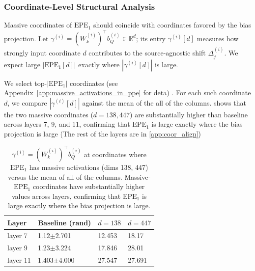 \documentclass[11pt]{article}
\newif\ifResolvedcomments
\newcommand{\Resolved}[1]{\ifResolvedcomments\textcolor{green}{[Resolved: #1]}\fi}
\begin{document}
\subsubsection{Coordinate-Level Structural Analysis}
\label{sec:wk_structure}
Massive coordinates of $\mathrm{EPE}_1$ should coincide with coordinates favored by the bias projection. Let $\gamma^{(i)}=(W_k^{(i)})^\top b_Q^{(i)}\in\mathbb{R}^d$; its entry $\gamma^{(i)}[d]$ measures how strongly input coordinate $d$ contributes to the source-agnostic shift $\Delta_j^{(i)}$. We expect large $|\mathrm{EPE}_1[d]|$ exactly where $|\gamma^{(i)}[d]|$ is large.

We select top-$|\mathrm{EPE}_1|$ coordinates (see Appendix~\ref{app:massive_activations_in_ppe} for deta) \Resolved{how do you identify this? I think its best to say we do this by hand a add a link to the appendix and add a histogram there of $\mathrm{EPE}_1$ showing that it's really clear which values are big}. For each such coordinate $d$, we compare $|\gamma^{(i)}[d]|$ against the mean of the all of the columns. \Resolved{Edit this to instead measure $\gamma^{(i)}[d]$ instead of the cos similarity to fit our new notation}  shows that the two massive coordinates ($d{=}138,447$) are substantially higher than baseline across layers 7, 9, and 11, confirming that $\mathrm{EPE}_1$ is large exactly where the bias projection is large (The rest of the layers are in \ref{app:coor_align})

\begin{table}[t]
  \centering
  \begin{tabular}{llll}
    \hline
    \textbf{Layer} & \textbf{Baseline (rand)} & \textbf{$d{=}138$} & \textbf{$d{=}447$}\\
    \hline
    layer 7   &   1.12$\pm$2.701    &    12.453   &    18.17         \\
    layer 9   &   1.23$\pm$3.224    &    17.846   &    28.01         \\
    layer 11  &   1.403$\pm$4.000   &    27.547   &    27.691        \\
    \hline
  \end{tabular}
  \caption{$\gamma^{(i)}=(W_k^{(i)})^\top b_Q^{(i)}$ at coordinates where $\mathrm{EPE}_1$ has massive activations (dims 138, 447) versus the mean of all of the columns. Massive-$\mathrm{EPE}_1$ coordinates have substantially higher values across layers, confirming that $\mathrm{EPE}_1$ is large exactly where the bias projection is large.}
  \label{obs3_table}
\end{table}
\end{document}
